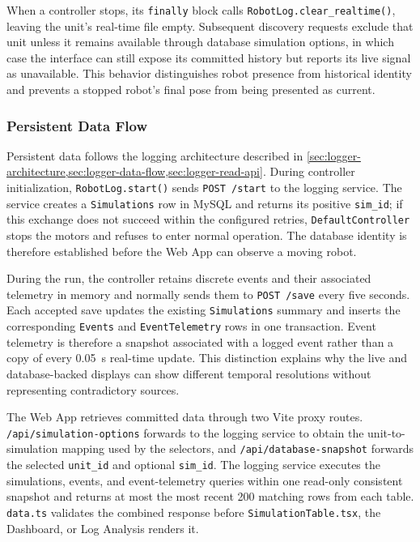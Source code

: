 When a controller stops, its \texttt{finally} block calls \texttt{RobotLog.clear\_realtime()}, leaving the unit's real-time file empty. Subsequent discovery requests exclude that unit unless it remains available through database simulation options, in which case the interface can still expose its committed history but reports its live signal as unavailable. This behavior distinguishes robot presence from historical identity and prevents a stopped robot's final pose from being presented as current.

\subsubsection{Persistent Data Flow}

Persistent data follows the logging architecture described in \cref{sec:logger-architecture,sec:logger-data-flow,sec:logger-read-api}. During controller initialization, \texttt{RobotLog.start()} sends \texttt{POST /start} to the logging service. The service creates a \texttt{Simulations} row in MySQL and returns its positive \texttt{sim\_id}; if this exchange does not succeed within the configured retries, \texttt{DefaultController} stops the motors and refuses to enter normal operation. The database identity is therefore established before the Web App can observe a moving robot.

During the run, the controller retains discrete events and their associated telemetry in memory and normally sends them to \texttt{POST /save} every five seconds. Each accepted save updates the existing \texttt{Simulations} summary and inserts the corresponding \texttt{Events} and \texttt{EventTelemetry} rows in one transaction. Event telemetry is therefore a snapshot associated with a logged event rather than a copy of every 0.05~s real-time update. This distinction explains why the live and database-backed displays can show different temporal resolutions without representing contradictory sources.

The Web App retrieves committed data through two Vite proxy routes. \texttt{/api/simulation-options} forwards to the logging service to obtain the unit-to-simulation mapping used by the selectors, and \texttt{/api/database-snapshot} forwards the selected \texttt{unit\_id} and optional \texttt{sim\_id}. The logging service executes the simulations, events, and event-telemetry queries within one read-only consistent snapshot and returns at most the most recent 200 matching rows from each table. \texttt{data.ts} validates the combined response before \texttt{SimulationTable.tsx}, the Dashboard, or Log Analysis renders it.

